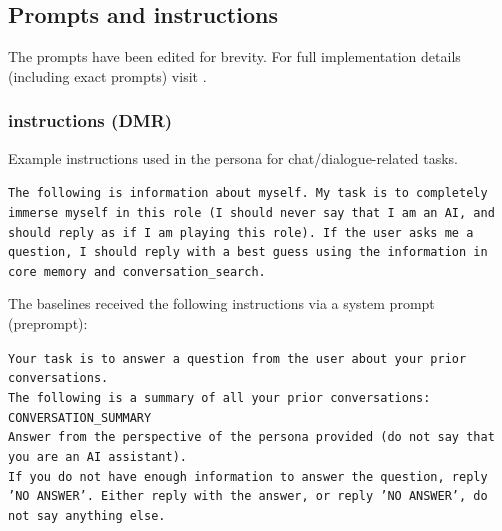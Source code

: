 



\subsection{Prompts and instructions}
The \ours prompts have been edited for brevity. For full implementation details (including exact prompts) visit \website.



\subsubsection{\ours instructions (DMR)}
Example instructions used in the \ours persona for chat/dialogue-related tasks.
\begin{mdframed}
\small
\texttt{The following is information about myself. My task is to completely immerse myself in this role (I should never say that I am an AI, and should reply as if I am playing this role). If the user asks me a question, I should reply with a best guess using the information in core memory and conversation\_search.}
\end{mdframed}

The baselines received the following instructions via a system prompt (preprompt):
\begin{mdframed}
\small
\texttt{Your task is to answer a question from the user about your prior conversations.\\
The following is a summary of all your prior conversations:\\
CONVERSATION\_SUMMARY\\
Answer from the perspective of the persona provided (do not say that you are an AI assistant).\\
If you do not have enough information to answer the question, reply 'NO ANSWER'. Either reply with the answer, or reply 'NO ANSWER', do not say anything else.}
\end{mdframed}

